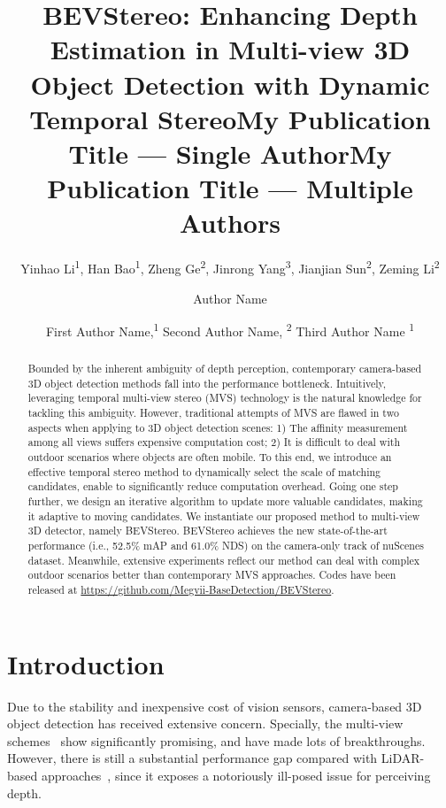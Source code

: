 \documentclass[letterpaper]{article} \usepackage[]{aaai23}  \usepackage{times}  \usepackage{helvet}  \usepackage{courier}  \usepackage[hyphens]{url}  \usepackage{graphicx} \urlstyle{rm} \def\UrlFont{\rm}  \usepackage{natbib}  \usepackage{caption} \frenchspacing  \setlength{\pdfpagewidth}{8.5in} \setlength{\pdfpageheight}{11in} \usepackage{algorithm}
\title{BEVStereo: Enhancing Depth Estimation in Multi-view 3D Object Detection with Dynamic Temporal Stereo}
\author{
    Yinhao Li\textsuperscript{\rm 1},
    Han Bao\textsuperscript{\rm 1},
    Zheng Ge\textsuperscript{\rm 2},
    Jinrong Yang\textsuperscript{\rm 3},
    Jianjian Sun\textsuperscript{\rm 2},
    Zeming Li\textsuperscript{\rm 2}
}
\title{My Publication Title --- Single Author}
\author {
    Author Name
}
\title{My Publication Title --- Multiple Authors}
\author {
First Author Name,\textsuperscript{\rm 1}
    Second Author Name, \textsuperscript{\rm 2}
    Third Author Name \textsuperscript{\rm 1}
}
\begin{document}
\pagestyle{plain}
\setcounter{page}{1}
\maketitle

\begin{abstract}
Bounded by the inherent ambiguity of depth perception, contemporary camera-based 3D object detection methods fall into the performance bottleneck. Intuitively, leveraging temporal multi-view stereo (MVS) technology is the natural knowledge for tackling this ambiguity. However, traditional attempts of MVS are flawed in two aspects when applying to 3D object detection scenes: 1) The affinity measurement among all views suffers expensive computation cost; 2) It is difficult to deal with outdoor scenarios where objects are often mobile. To this end, we introduce an effective temporal stereo method to dynamically select the scale of matching candidates, enable to significantly reduce computation overhead. Going one step further, we design an iterative algorithm to update more valuable candidates, making it adaptive to moving candidates. We instantiate our proposed method to multi-view 3D detector, namely BEVStereo. BEVStereo achieves the new state-of-the-art performance (i.e., 52.5\% mAP and 61.0\% NDS) on the camera-only track of nuScenes dataset. Meanwhile, extensive experiments reflect our method can deal with complex outdoor scenarios better than contemporary MVS approaches. Codes have been released at \href{https://github.com/Megvii-BaseDetection/BEVStereo}{https://github.com/Megvii-BaseDetection/BEVStereo}.

\end{abstract}

\section{Introduction}
Due to the stability and inexpensive cost of vision sensors, camera-based 3D object detection has received extensive concern. Specially, the multi-view schemes~\cite{wang2022detr3d, huang2021bevdet, liu2022petr, li2022bevformer, huang2022bevdet4d, liu2022petrv2, li2022bevdepth} show significantly promising, and have made lots of breakthroughs. However, there is still a substantial performance gap compared with LiDAR-based approaches~\cite{lang2019pointpillars, yan2018second, yin2021center}, since it exposes a notoriously ill-posed issue for perceiving depth.
\end{document}
